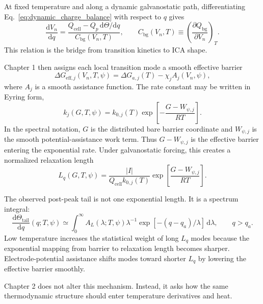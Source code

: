 \documentclass[11pt,a4paper]{article}
\newcommand{\dd}{\mathrm{d}}
\newcommand{\eff}{\mathrm{eff}}
\newcommand{\bg}{\mathrm{bg}}
\newcommand{\cell}{\mathrm{cell}}
\newcommand{\tail}{\mathrm{tail}}
\begin{document}
At fixed temperature and along a dynamic galvanostatic path, differentiating Eq.~\eqref{eq:dynamic_charge_balance}
with respect to \(q\) gives
\begin{equation}
\frac{\dd V_n}{\dd q}
=
\frac{Q_{\cell}-Q_p\,\dd\Theta/\dd q}{C_{\bg}(V_n,T)},
\qquad
C_{\bg}(V_n,T)\equiv
\left(\frac{\partial Q_{\bg}}{\partial V_n}\right)_T.
\label{eq:ch1_dvdq}
\end{equation}
This relation is the bridge from transition kinetics to ICA shape.

Chapter 1 then assigns each local transition mode a smooth effective barrier
\begin{equation}
\Delta G_{\eff,j}(V_n,T,\psi)
=
\Delta G_{a,j}(T)-\chi_j A_j(V_n,\psi),
\label{eq:effective_barrier}
\end{equation}
where \(A_j\) is a smooth assistance function. The rate constant may be written in Eyring form,
\begin{equation}
k_j(G,T,\psi)
=
k_{0,j}(T)
\exp\!\left[-\frac{G-W_{\psi,j}}{RT}\right].
\label{eq:rate}
\end{equation}
In the spectral notation, \(G\) is the distributed bare barrier coordinate and \(W_{\psi,j}\) is the smooth
potential-assistance work term. Thus \(G-W_{\psi,j}\) is the effective barrier entering the exponential rate.
Under galvanostatic forcing, this creates a normalized relaxation length
\begin{equation}
L_q(G,T,\psi)
=
\frac{|I|}{Q_{\cell}k_{0,j}(T)}
\exp\!\left[\frac{G-W_{\psi,j}}{RT}\right].
\label{eq:Lq}
\end{equation}

The observed post-peak tail is not one exponential length. It is a spectrum integral:
\begin{equation}
\frac{\dd\Theta_{\tail}}{\dd q}(q;T,\psi)
\simeq
\int_0^\infty
A_L(\lambda;T,\psi)\lambda^{-1}
\exp[-(q-q_a)/\lambda]\,\dd\lambda,
\qquad q>q_a.
\label{eq:tail_kernel}
\end{equation}
Low temperature increases the statistical weight of long \(L_q\) modes because the exponential mapping from
barrier to relaxation length becomes sharper. Electrode-potential assistance shifts modes toward shorter
\(L_q\) by lowering the effective barrier smoothly.

Chapter 2 does not alter this mechanism. Instead, it asks how the same thermodynamic structure should enter
temperature derivatives and heat.

\end{document}
